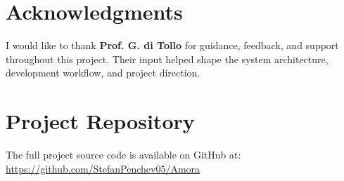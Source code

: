 \documentclass[sigconf, authorversion, nonacm, margin=0.75in]{acmart}
\begin{document}
\section*{Acknowledgments}
I would like to thank \textbf{Prof. G. di Tollo} for guidance, feedback, and support throughout this project. Their input helped shape the system architecture, development workflow, and project direction.




\section*{Project Repository}
The full project source code is available on GitHub at: \\
\url{https://github.com/StefanPenchev05/Amora}
\end{document}
